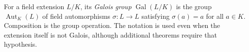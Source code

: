 
For a field extension $L/K$, its \emph{Galois group} $\operatorname{Gal}(L/K)$ is the group $\operatorname{Aut}_K(L)$ of field automorphisms $\sigma:L\to L$ satisfying $\sigma(a)=a$ for all $a\in K$. Composition is the group operation. The notation is used even when the extension itself is not Galois, although additional theorems require that hypothesis.
